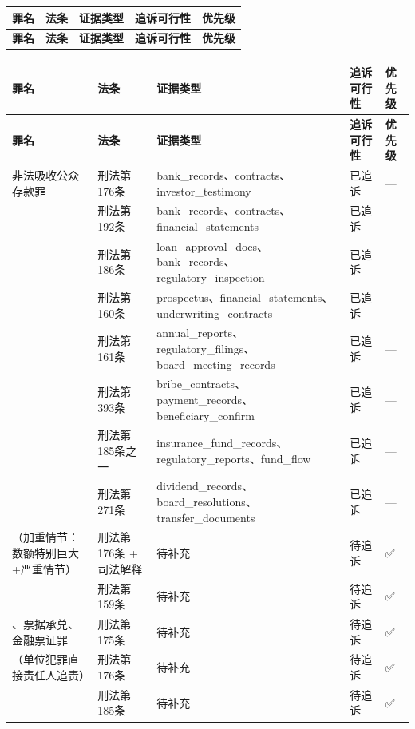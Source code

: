 \documentclass[11pt,a4paper,oneside]{article}
\begin{document}
\begin{longtable}{|p{2.5cm}|p{2.5cm}|p{3cm}|p{3cm}|p{2cm}|}
\toprule
\textbf{罪名} & \textbf{法条} & \textbf{证据类型} & \textbf{追诉可行性} & \textbf{优先级} \\
\midrule
\endfirsthead
\textbf{罪名} & \textbf{法条} & \textbf{证据类型} & \textbf{追诉可行性} & \textbf{优先级} \\
\midrule
\endhead
\bottomrule
\end{longtable}\begin{longtable}{|p{2.5cm}|p{2.5cm}|p{3cm}|p{3cm}|p{2cm}|}
\toprule
\textbf{罪名} & \textbf{法条} & \textbf{证据类型} & \textbf{追诉可行性} & \textbf{优先级} \\
\midrule\endfirsthead
\textbf{罪名} & \textbf{法条} & \textbf{证据类型} & \textbf{追诉可行性} & \textbf{优先级} \\
\midrule\endhead
非法吸收公众存款罪 & 刑法第176条 & bank_records、contracts、investor_testimony & 已追诉 & —\\
 & 刑法第192条 & bank_records、contracts、financial_statements & 已追诉 & —\\
 & 刑法第186条 & loan_approval_docs、bank_records、regulatory_inspection & 已追诉 & —\\
 & 刑法第160条 & prospectus、financial_statements、underwriting_contracts & 已追诉 & —\\
 & 刑法第161条 & annual_reports、regulatory_filings、board_meeting_records & 已追诉 & —\\
 & 刑法第393条 & bribe_contracts、payment_records、beneficiary_confirm & 已追诉 & —\\
 & 刑法第185条之一 & insurance_fund_records、regulatory_reports、fund_flow & 已追诉 & —\\
 & 刑法第271条 & dividend_records、board_resolutions、transfer_documents & 已追诉 & —\\
（加重情节：数额特别巨大+严重情节） & 刑法第176条 + 司法解释 & 待补充 & 待追诉 & ✅\\
 & 刑法第159条 & 待补充 & 待追诉 & ✅\\
、票据承兑、金融票证罪 & 刑法第175条 & 待补充 & 待追诉 & ✅\\
（单位犯罪直接责任人追责） & 刑法第176条 & 待补充 & 待追诉 & ✅\\
 & 刑法第185条 & 待补充 & 待追诉 & ✅\\

\end{longtable}
\end{document}
